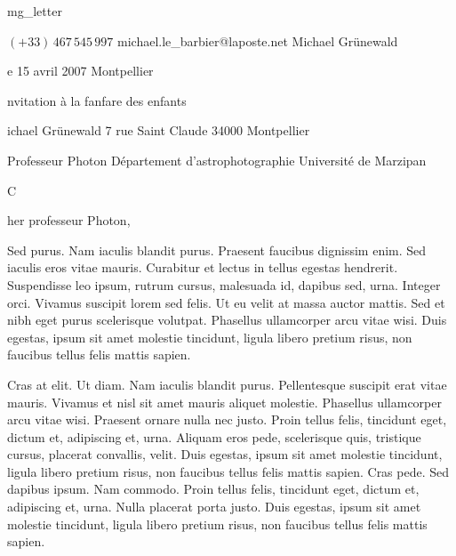 


\class mg_letter

%
%



\phone          $(+33)\,467\,545\,997$
\email          michael.le\_barbier@laposte.net
\name           Michael Grünewald
\date           le 15 avril 2007
\place          Montpellier
\subject        Invitation à la fanfare des enfants


\address
Michael Grünewald
7 rue Saint Claude
34000 Montpellier

\addressee
Professeur Photon
Département d'astrophotographie
Université de Marzipan

%
%


\opening        Cher professeur Photon,

Sed purus. Nam iaculis blandit purus. Praesent faucibus dignissim
enim. Sed iaculis eros vitae mauris. Curabitur et lectus in tellus
egestas hendrerit. Suspendisse leo ipsum, rutrum cursus, malesuada id,
dapibus sed, urna. Integer orci. Vivamus suscipit lorem sed felis. Ut
eu velit at massa auctor mattis. Sed et nibh eget purus scelerisque
volutpat. Phasellus ullamcorper arcu vitae wisi. Duis egestas, ipsum
sit amet molestie tincidunt, ligula libero pretium risus, non faucibus
tellus felis mattis sapien.

Cras at elit. Ut diam. Nam iaculis blandit purus. Pellentesque
suscipit erat vitae mauris. Vivamus et nisl sit amet mauris aliquet
molestie. Phasellus ullamcorper arcu vitae wisi. Praesent ornare nulla
nec justo. Proin tellus felis, tincidunt eget, dictum et, adipiscing
et, urna. Aliquam eros pede, scelerisque quis, tristique cursus,
placerat convallis, velit. Duis egestas, ipsum sit amet molestie
tincidunt, ligula libero pretium risus, non faucibus tellus felis
mattis sapien. Cras pede. Sed dapibus ipsum. Nam commodo. Proin tellus
felis, tincidunt eget, dictum et, adipiscing et, urna. Nulla placerat
porta justo. Duis egestas, ipsum sit amet molestie tincidunt, ligula
libero pretium risus, non faucibus tellus felis mattis sapien.

